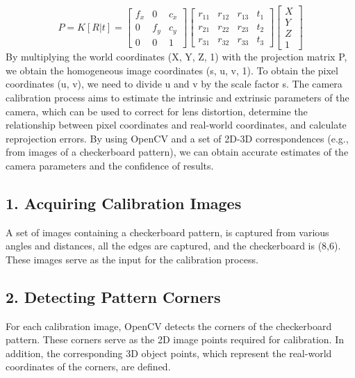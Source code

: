 \documentclass{article}
\begin{document}
\begin{equation*}
    P = K [R | t] =
    \begin{bmatrix}
    f_x & 0 & c_x \\
    0 & f_y & c_y \\
    0 & 0 & 1
    \end{bmatrix}
    \begin{bmatrix}
    r_{11} & r_{12} & r_{13} & t_1 \\
    r_{21} & r_{22} & r_{23} & t_2 \\
    r_{31} & r_{32} & r_{33} & t_3
    \end{bmatrix}
    \begin{bmatrix}
        X \\
        Y \\
        Z \\
        1
    \end{bmatrix}
\end{equation*}
\noindent
By multiplying the world coordinates (X, Y, Z, 1) 
with the projection matrix P, 
we obtain the homogeneous image coordinates (s, u, v, 1). 
To obtain the pixel coordinates (u, v), 
we need to divide u and v by the scale factor s.
\newline
The camera calibration process aims to estimate 
the intrinsic and extrinsic parameters of the camera, 
which can be used to correct for lens distortion, 
determine the relationship between pixel coordinates 
and real-world coordinates, and calculate reprojection errors. 
By using OpenCV and a set of 2D-3D correspondences 
(e.g., from images of a checkerboard pattern), 
we can obtain accurate estimates of the camera parameters 
and the confidence of results.

\subsection*{1. Acquiring Calibration Images}
A set of images containing a checkerboard pattern, 
is captured from various angles and distances,
all the edges are captured, and the checkerboard is (8,6).
These images serve as the input for the calibration process.

\subsection*{2. Detecting Pattern Corners}
For each calibration image, 
OpenCV detects the corners of the checkerboard pattern. 
These corners serve as the 2D image points 
required for calibration. 
In addition, the corresponding 3D object points, 
which represent the real-world coordinates 
of the corners, are defined.
\end{document}
